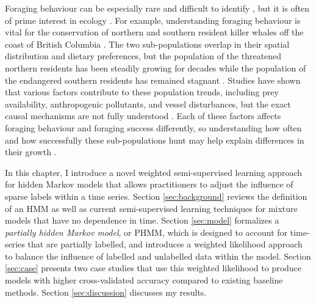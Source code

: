 Foraging behaviour can be especially rare and difficult to identify \citep{Saldanha:2023}, but it is often of prime interest in ecology \citep{Stephens:2008}. For example, understanding foraging behaviour is vital for the conservation of northern and southern resident killer whales off the coast of British Columbia \citep{Lusseau:2009, Joy:2019, Tennessen:2023}. The two sub-populations overlap in their spatial distribution and dietary preferences, but the population of the threatened northern residents has been steadily growing for decades while the population of the endangered southern residents has remained stagnant \citep{Tennessen:2023, DFO:2018}.  %
Studies have shown that various factors contribute to these population trends, including prey availability, anthropogenic pollutants, and vessel disturbances, but the exact causal mechanisms are not fully understood \citep{Lusseau:2009, Joy:2019, Murray:2021}. Each of these factors affects foraging behaviour and foraging success differently, so understanding how often and how successfully these sub-populations hunt may help explain differences in their growth \citep{Noren:2011, Tennessen:2023}. 
 
In this chapter, I introduce a novel weighted semi-supervised learning approach for hidden Markov models that allows practitioners to adjust the influence of sparse labels within a time series. 
Section \ref{sec:background} reviews the definition of an HMM as well as current semi-supervised learning techniques for %
mixture models that have no dependence in time. Section \ref{sec:model} formalizes a \textit{partially hidden Markov model}, or PHMM, which is designed to account for time-series that are partially labelled, and introduces a weighted likelihood approach to balance the influence of labelled and unlabelled data within the model. Section \ref{sec:case} presents two case studies that use this weighted likelihood to produce models with higher cross-validated accuracy compared to existing baseline methods. Section \ref{sec:discussion} discusses my results.

